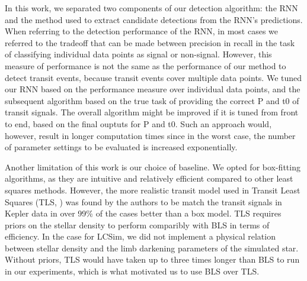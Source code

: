 In this work, we separated two components of our detection algorithm: the RNN and the method used to extract candidate detections from the RNN's predictions. When referring to the detection performance of the RNN, in most cases we referred to the tradeoff that can be made between precision in recall in the task of classifying individual data points as signal or non-signal. However, this measure of performance is not the same as the performance of our method to detect transit events, because transit events cover multiple data points. We tuned our RNN based on the performance measure over individual data points, and the subsequent algorithm based on the true task of providing the correct P and t0 of transit signals. The overall algorithm might be improved if it is tuned from front to end, based on the final ouptuts for P and t0. Such an approach would, however, result in longer computation times since in the worst case, the number of parameter settings to be evaluated is increased exponentially.

Another limitation of this work is our choice of baseline. We opted for box-fitting algorithms, as they are intuitive and relatively efficient compared to other least squares methods. However, the more realistic transit model used in Transit Least Squares (TLS, ) was found by the authors to be match the transit signals in Kepler data in over 99\% of the cases better than a box model. TLS requires priors on the stellar density to perform comparibly with BLS in terms of efficiency. In the case for LCSim, we did not implement a physical relation between stellar density and the limb darkening parameters of the simulated star. Without priors, TLS would have taken up to three times longer than BLS to run in our experiments, which is what motivated us to use BLS over TLS. 

